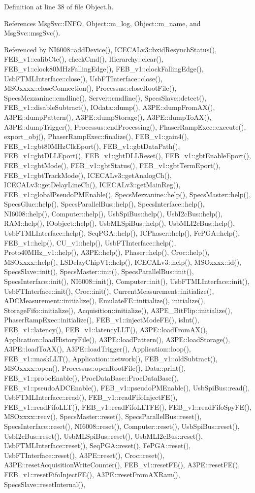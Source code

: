 Definition at line 38 of file Object.h.

References MsgSvc::INFO, Object::m\_\-log, Object::m\_\-name, and MsgSvc::msgSvc().

Referenced by NI6008::addDevice(), ICECALv3::bxidResynchStatus(), FEB\_\-v1::calibCte(), checkCmd(), Hierarchy::clear(), FEB\_\-v1::clock80MHzFallingEdge(), FEB\_\-v1::clockFallingEdge(), UsbFTMLInterface::close(), UsbFTInterface::close(), MSOxxxx::closeConnection(), Processus::closeRootFile(), SpecsMezzanine::cmdline(), Server::cmdline(), SpecsSlave::detect(), FEB\_\-v1::disableSubtract(), IOdata::dump(), A3PE::dumpFromAX(), A3PE::dumpPattern(), A3PE::dumpStorage(), A3PE::dumpToAX(), A3PE::dumpTrigger(), Processus::endProcessing(), PhaserRampExec::execute(), export\_\-obj(), PhaserRampExec::finalize(), FEB\_\-v1::gain4(), FEB\_\-v1::gbt80MHzClkEport(), FEB\_\-v1::gbtDataPath(), FEB\_\-v1::gbtDLLEport(), FEB\_\-v1::gbtDLLReset(), FEB\_\-v1::gbtEnableEport(), FEB\_\-v1::gbtMode(), FEB\_\-v1::gbtStatus(), FEB\_\-v1::gbtTermEport(), FEB\_\-v1::gbtTrackMode(), ICECALv3::getAnalogCh(), ICECALv3::getDelayLineCh(), ICECALv3::getMainReg(), FEB\_\-v1::globalPseudoPMEnable(), SpecsMezzanine::help(), SpecsMaster::help(), SpecsGlue::help(), SpecsParallelBus::help(), SpecsInterface::help(), NI6008::help(), Computer::help(), UsbSpiBus::help(), UsbI2cBus::help(), RAM::help(), IOobject::help(), UsbMLSpiBus::help(), UsbMLI2cBus::help(), UsbFTMLInterface::help(), SeqPGA::help(), ICPhaser::help(), FePGA::help(), FEB\_\-v1::help(), CU\_\-v1::help(), UsbFTInterface::help(), Proto40MHz\_\-v1::help(), A3PE::help(), Phaser::help(), Croc::help(), MSOxxxx::help(), LSDelayChipV1::help(), ICECALv3::help(), MSOxxxx::id(), SpecsSlave::init(), SpecsMaster::init(), SpecsParallelBus::init(), SpecsInterface::init(), NI6008::init(), Computer::init(), UsbFTMLInterface::init(), UsbFTInterface::init(), Croc::init(), CurrentMeasurement::initialize(), ADCMeasurement::initialize(), EmulateFE::initialize(), initialize(), StorageFifo::initialize(), Acquisition::initialize(), A3PE\_\-BitFlip::initialize(), PhaserRampExec::initialize(), FEB\_\-v1::injectModeFE(), isInt(), FEB\_\-v1::latency(), FEB\_\-v1::latencyLLT(), A3PE::loadFromAX(), Application::loadHistoryFile(), A3PE::loadPattern(), A3PE::loadStorage(), A3PE::loadToAX(), A3PE::loadTrigger(), Application::loop(), FEB\_\-v1::maskLLT(), Application::network(), FEB\_\-v1::oldSubtract(), MSOxxxx::open(), Processus::openRootFile(), Data::print(), FEB\_\-v1::probeEnable(), ProcDataBase::ProcDataBase(), FEB\_\-v1::pseudoADCEnable(), FEB\_\-v1::pseudoPMEnable(), UsbSpiBus::read(), UsbFTMLInterface::read(), FEB\_\-v1::readFifoInjectFE(), FEB\_\-v1::readFifoLLT(), FEB\_\-v1::readFifoLLTFE(), FEB\_\-v1::readFifoSpyFE(), MSOxxxx::recv(), SpecsMaster::reset(), SpecsParallelBus::reset(), SpecsInterface::reset(), NI6008::reset(), Computer::reset(), UsbSpiBus::reset(), UsbI2cBus::reset(), UsbMLSpiBus::reset(), UsbMLI2cBus::reset(), UsbFTMLInterface::reset(), SeqPGA::reset(), FePGA::reset(), UsbFTInterface::reset(), A3PE::reset(), Croc::reset(), A3PE::resetAcquisitionWriteCounter(), FEB\_\-v1::resetFE(), A3PE::resetFE(), FEB\_\-v1::resetFifoInjectFE(), A3PE::resetFromAXRam(), SpecsSlave::resetInternal(), 